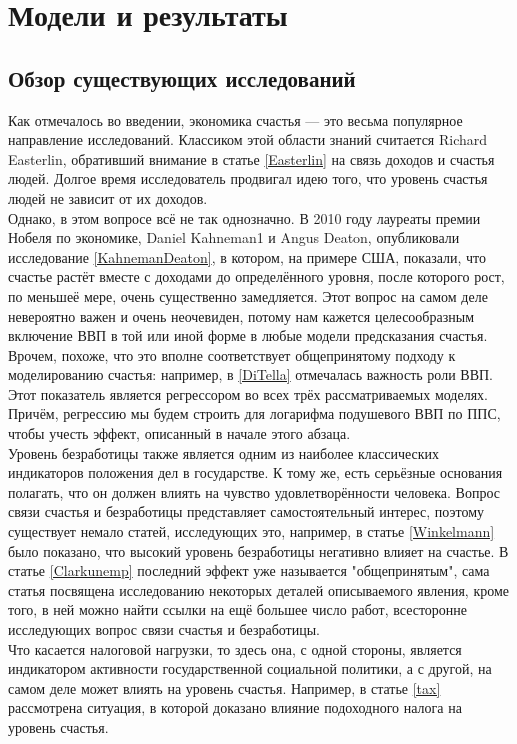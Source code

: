 \documentclass[russian]{vegareport}
\begin{document}
    \chapter{Модели и результаты}
    \section{Обзор существующих исследований}
    Как отмечалось во введении, экономика счастья --- это весьма популярное направление исследований. Классиком этой области знаний считается Richard Easterlin, обративший внимание в статье \ref{Easterlin} на связь доходов и счастья людей. Долгое время исследователь продвигал идею того, что уровень счастья людей не зависит от их доходов. 
    \\
    Однако, в этом вопросе всё не так однозначно. В 2010 году лауреаты премии Нобеля по экономике, Daniel Kahneman1 и Angus Deaton, опубликовали исследование \ref{KahnemanDeaton}, в котором, на примере США, показали, что счастье растёт вместе с доходами до определённого уровня, после которого рост, по меньшеё мере, очень существенно замедляется. Этот вопрос на самом деле невероятно важен и очень неочевиден, потому нам кажется целесообразным включение ВВП в той или иной форме в любые модели предсказания счастья. Врочем, похоже, что это вполне соответствует общепринятому подходу к моделированию счастья: например, в \ref{DiTella} отмечалась важность роли ВВП. Этот показатель является регрессором во всех трёх рассматриваемых моделях. Причём, регрессию мы будем строить для логарифма подушевого ВВП по ППС, чтобы учесть эффект, описанный в начале этого абзаца.
    \\
    Уровень безработицы также является одним из наиболее классических индикаторов положения дел в государстве. К тому же, есть серьёзные основания полагать, что он должен влиять на чувство удовлетворённости человека. Вопрос связи счастья и безработицы представляет самостоятельный интерес, поэтому существует немало статей, исследующих это, например, в статье \ref{Winkelmann} было показано, что высокий уровень безработицы негативно влияет на счастье. В статье \ref{Clarkunemp} последний эффект уже называется "общепринятым", сама статья посвящена исследованию некоторых деталей описываемого явления, кроме того, в ней можно найти ссылки на ещё большее число работ, всесторонне исследующих вопрос связи счастья и безработицы. 
    \\
    Что касается налоговой нагрузки, то здесь она, с одной стороны, является индикатором активности государственной социальной политики, а с другой, на самом деле может влиять на уровень счастья. Например, в статье \ref{tax} рассмотрена ситуация, в которой доказано влияние подоходного налога на уровень счастья. 
\end{document}
